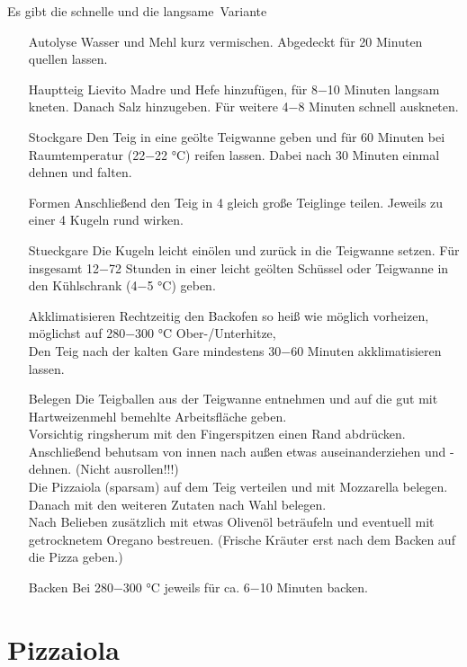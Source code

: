 Es gibt die schnelle und die \glqq langsame\grqq\ Variante
\begin{enumerate}
    \item [\Gls{Autolyse}] Wasser und Mehl kurz vermischen. Abgedeckt für 20 Minuten quellen lassen.
    
    \item [\Gls{Hauptteig}] Lievito Madre und Hefe hinzufügen, für 8−10 Minuten langsam kneten. Danach Salz hinzugeben. Für weitere 4−8 Minuten schnell auskneten.
    \item [\Gls{Stockgare}] Den Teig in eine geölte Teigwanne geben und für 60 Minuten bei Raumtemperatur (22−22 °C) reifen lassen.
    Dabei nach 30 Minuten einmal dehnen und falten.
    \item [\Gls{Formen}]  Anschließend den Teig in 4 gleich große Teiglinge teilen. Jeweils zu einer 4 Kugeln rund wirken.
    \item [\Gls{Stueckgare}]  Die Kugeln leicht einölen und zurück in die Teigwanne setzen. Für insgesamt 12−72 Stunden in einer leicht geölten Schüssel oder Teigwanne in den Kühlschrank (4−5 °C) geben.
    \item [\Gls{Akklimatisieren}] Rechtzeitig den Backofen so heiß wie möglich vorheizen, möglichst auf 280−300 °C Ober-/Unterhitze,\\
    Den Teig nach der kalten Gare mindestens 30−60 Minuten akklimatisieren lassen.
    \item[Belegen] 
    Die Teigballen aus der Teigwanne entnehmen und auf die gut mit Hartweizenmehl bemehlte Arbeitsfläche geben.\\
    Vorsichtig ringsherum mit den Fingerspitzen einen Rand abdrücken.
    Anschließend behutsam von innen nach außen etwas auseinanderziehen und -dehnen. (Nicht ausrollen!!!)\\
    Die Pizzaiola (sparsam) auf dem Teig verteilen und mit Mozzarella belegen.\\
    Danach mit den weiteren Zutaten nach Wahl belegen.\\
    Nach Belieben zusätzlich mit etwas Olivenöl beträufeln und eventuell mit getrocknetem Oregano bestreuen. (Frische Kräuter erst nach dem Backen auf die Pizza geben.)
    \item [\Gls{Backen}] Bei 280−300 °C jeweils für ca. 6−10 Minuten backen. 
\end{enumerate}
%

\section{Pizzaiola}
